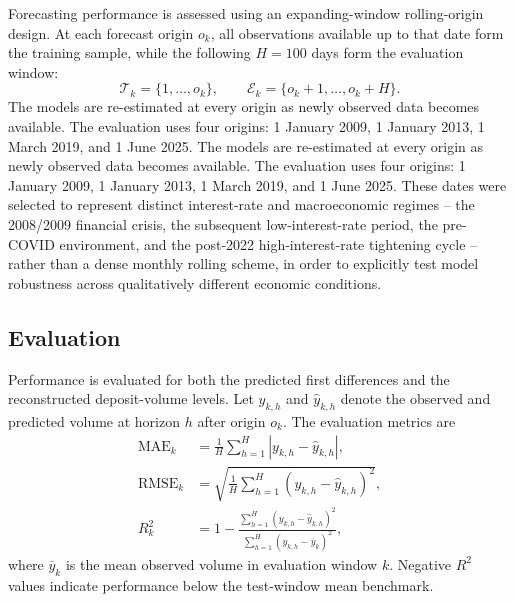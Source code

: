\documentclass[11pt,a4paper]{article}
\begin{document}
Forecasting performance is assessed using an expanding-window rolling-origin
design. At each forecast origin \(o_k\), all observations available up to that
date form the training sample, while the following \(H=100\) days form the
evaluation window:
\begin{equation*}
    \mathcal{T}_k=\{1,\ldots,o_k\},
    \qquad
    \mathcal{E}_k=\{o_k+1,\ldots,o_k+H\}.
\end{equation*}
The models are re-estimated at every origin as newly observed data becomes
available. The evaluation uses four origins: 1 January 2009, 1 January 2013,
1 March 2019, and 1 June 2025.
The models are re-estimated at every origin as newly observed data becomes
available. The evaluation uses four origins: 1 January 2009, 1 January 2013,
1 March 2019, and 1 June 2025. These dates were selected to represent
distinct interest-rate and macroeconomic regimes -- the 2008/2009 financial
crisis, the subsequent low-interest-rate period, the pre-COVID environment,
and the post-2022 high-interest-rate tightening cycle -- rather than a dense
monthly rolling scheme, in order to explicitly test model robustness across
qualitatively different economic conditions.

\subsection{Evaluation}
\label{subsec:evaluation_metrics}

Performance is evaluated for both the predicted first differences and the
reconstructed deposit-volume levels. Let \(y_{k,h}\) and
\(\widehat{y}_{k,h}\) denote the observed and predicted volume at horizon \(h\)
after origin \(o_k\). The evaluation metrics are
\begin{align*}
    \operatorname{MAE}_k
    &=
    \frac{1}{H}
    \sum_{h=1}^{H}
    \left|y_{k,h}-\widehat{y}_{k,h}\right|, \\
    \operatorname{RMSE}_k
    &=
    \sqrt{
        \frac{1}{H}
        \sum_{h=1}^{H}
        \left(y_{k,h}-\widehat{y}_{k,h}\right)^2
    }, \\
    R_k^2
    &=
    1-
    \frac{
        \sum_{h=1}^{H}
        \left(y_{k,h}-\widehat{y}_{k,h}\right)^2
    }{
        \sum_{h=1}^{H}
        \left(y_{k,h}-\overline{y}_k\right)^2
    },
\end{align*}
where \(\overline{y}_k\) is the mean observed volume in evaluation window
\(k\). Negative \(R^2\) values indicate performance below the test-window mean
benchmark.
\end{document}
